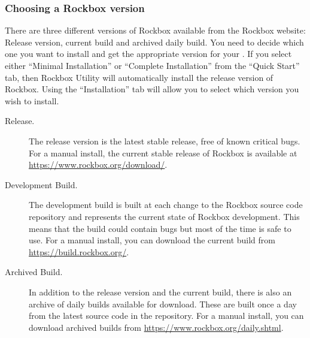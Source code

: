 \subsubsection{Choosing a Rockbox version}\label{sec:choosing_version}

There are three different versions of Rockbox available from the
Rockbox website:
\label{Version}
Release version, current build and archived daily build. You need to decide which one
you want to install and get the appropriate version for your \dap{}. If you
select either ``Minimal Installation'' or ``Complete Installation'' from the
``Quick Start'' tab, then Rockbox Utility will automatically install the
release version of Rockbox. Using the ``Installation'' tab will allow you
to select which version you wish to install.

\begin{description}

\item[Release.] The release version is the latest stable release, free
   of known critical bugs. For a manual install, the current stable release of Rockbox is
   available at \url{https://www.rockbox.org/download/}.

\item[Development Build.] The development build is built at each change to
  the Rockbox source code repository and represents the current state of Rockbox
  development. This means that the build could contain bugs but most of
  the time is safe to use. For a manual install, you can download the current build from
  \url{https://build.rockbox.org/}.

\item[Archived Build.] In addition to the release version and the current build,
  there is also an archive of daily builds available for download. These are
  built once a day from the latest source code in the repository. For a manual install,
  you can download archived builds from \url{https://www.rockbox.org/daily.shtml}.

\end{description}

